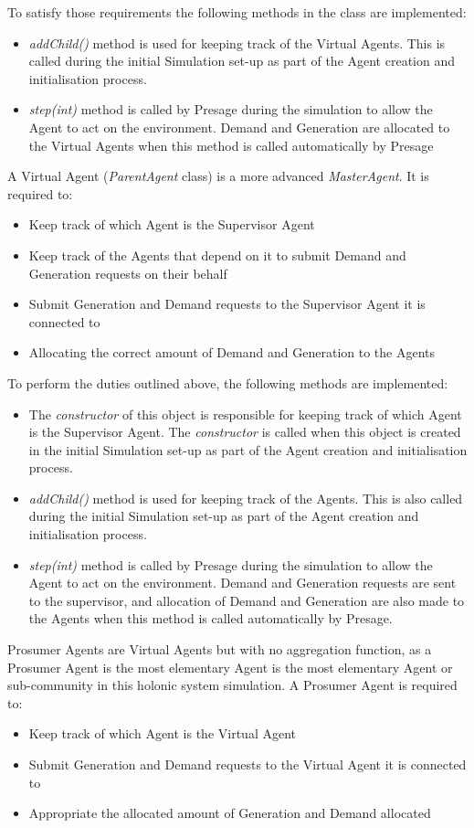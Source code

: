 To satisfy those requirements the following methods in the class are implemented:
\begin{itemize}
	\item \textit{addChild()} method is used for keeping track of the Virtual Agents. This is called during the initial Simulation set-up as part of the Agent creation and initialisation process.
	\item \textit{step(int)} method is called by Presage during the simulation to allow the Agent to act on the environment. Demand and Generation are allocated to the Virtual Agents when this method is called automatically by Presage
\end{itemize}

A Virtual Agent (\textit{ParentAgent} class) is a more advanced \textit{MasterAgent}. It is required to:
\begin{itemize}
	\item Keep track of which Agent is the Supervisor Agent
	\item Keep track of the Agents that depend on it to submit Demand and Generation requests on their behalf
	\item Submit Generation and Demand requests to the Supervisor Agent it is connected to
	\item Allocating the correct amount of Demand and Generation to the Agents
\end{itemize}

To perform the duties outlined above, the following methods are implemented:
\begin{itemize}
	\item The \textit{constructor} of this object is responsible for keeping track of which Agent is the Supervisor Agent. The \textit{constructor} is called when this object is created in the initial Simulation set-up as part of the Agent creation and initialisation process.
	\item \textit{addChild()} method is used for keeping track of the Agents. This is also called during the initial Simulation set-up as part of the Agent creation and initialisation process.
	\item \textit{step(int)} method is called by Presage during the simulation to allow the Agent to act on the environment. Demand and Generation requests are sent to the supervisor, and allocation of Demand and Generation are also made to the Agents when this method is called automatically by Presage.
\end{itemize}

Prosumer Agents are Virtual Agents but with no aggregation function, as a Prosumer Agent is the most elementary Agent is the most elementary Agent or sub-community in this holonic system simulation. A Prosumer Agent is required to:
\begin{itemize}
	\item Keep track of which Agent is the Virtual Agent
	\item Submit Generation and Demand requests to the Virtual Agent it is connected to
	\item Appropriate the allocated amount of Generation and Demand allocated
\end{itemize}

